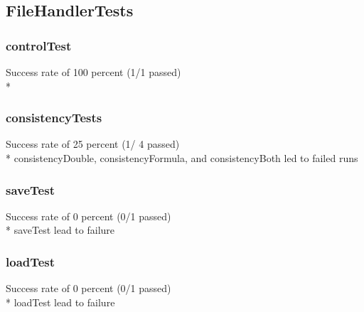 \documentclass[12pt]{article}
\begin{document}
\subsection{FileHandlerTests}
\subsubsection{controlTest}
Success rate of 100 percent (1/1 passed) \\*
\subsubsection{consistencyTests}
Success rate of 25 percent (1/ 4 passed) \\*
consistencyDouble, consistencyFormula, and consistencyBoth led to failed runs 

\subsubsection{saveTest}
Success rate of 0 percent (0/1 passed) \\*
saveTest lead to failure

\subsubsection{loadTest}
Success rate of 0 percent (0/1 passed) \\*
loadTest lead to failure
\end{document}
